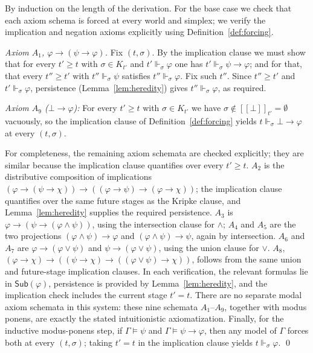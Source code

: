 \documentclass[final,12pt]{elsarticle}
\newcommand{\llbracket}{[\![}
\newcommand{\rrbracket}{]\!]}
\theoremstyle{plain}
\theoremstyle{definition}
\begin{document}
\proof
By induction on the length of the derivation. For the base case we check that each axiom schema is forced at every world and simplex; we verify the implication and negation axioms explicitly using Definition~\ref{def:forcing}.

\emph{Axiom \(A_1\), \(\varphi \to (\psi \to \varphi)\).} Fix \((t,\sigma)\). By the implication clause we must show that for every \(t' \ge t\) with \(\sigma \in K_{t'}\) and \(t' \Vdash_\sigma \varphi\) one has \(t' \Vdash_\sigma \psi \to \varphi\); and for that, that every \(t'' \ge t'\) with \(t'' \Vdash_\sigma \psi\) satisfies \(t'' \Vdash_\sigma \varphi\). Fix such \(t''\). Since \(t'' \ge t'\) and \(t' \Vdash_\sigma \varphi\), persistence (Lemma~\ref{lem:heredity}) gives \(t'' \Vdash_\sigma \varphi\), as required.


\emph{Axiom \(A_9\) (\(\bot \to \varphi\)):} For every \(t' \ge t\) with
\(\sigma \in K_{t'}\) we have \(\sigma \notin \llbracket \bot \rrbracket_{t'} = \emptyset\)
vacuously, so the implication clause of Definition~\ref{def:forcing} yields
\(t \Vdash_\sigma \bot \to \varphi\) at every \((t,\sigma)\).

For completeness, the remaining axiom schemata are checked explicitly; they are
similar because the implication clause quantifies over every \(t'\ge t\).
\(A_2\)
is the distributive composition of implications
\((\varphi\to(\psi\to\chi))\to((\varphi\to\psi)\to(\varphi\to\chi))\);
the implication clause quantifies over the same future stages as the Kripke clause,
and Lemma~\ref{lem:heredity} supplies the required persistence. \(A_3\) is
\(\varphi\to(\psi\to(\varphi\wedge\psi))\), using the intersection clause for
\(\wedge\); \(A_4\) and \(A_5\) are the two projections
\((\varphi\wedge\psi)\to\varphi\) and
\((\varphi\wedge\psi)\to\psi\), again by intersection. \(A_6\) and \(A_7\) are
\(\varphi\to(\varphi\vee\psi)\) and \(\psi\to(\varphi\vee\psi)\), using the union
clause for \(\vee\). \(A_8\),
\((\varphi\to\chi)\to((\psi\to\chi)\to((\varphi\vee\psi)\to\chi))\), follows from
the same union and future-stage implication clauses. In each verification, the
relevant formulas lie in \(\mathsf{Sub}(\varphi)\), persistence is provided by
Lemma~\ref{lem:heredity}, and the implication check includes the current stage
\(t'=t\). There are no separate modal axiom schemata in this system: these nine
schemata \(A_1\)--\(A_9\), together with modus ponens, are exactly the stated
intuitionistic axiomatization. Finally, for the inductive modus-ponens step, if
\(\Gamma \vDash \psi\) and \(\Gamma \vDash \psi \to \varphi\), then any model of
\(\Gamma\) forces both at every \((t,\sigma)\); taking \(t'=t\) in the implication
clause yields \(t \Vdash_\sigma \varphi\).
\qed
\end{document}
